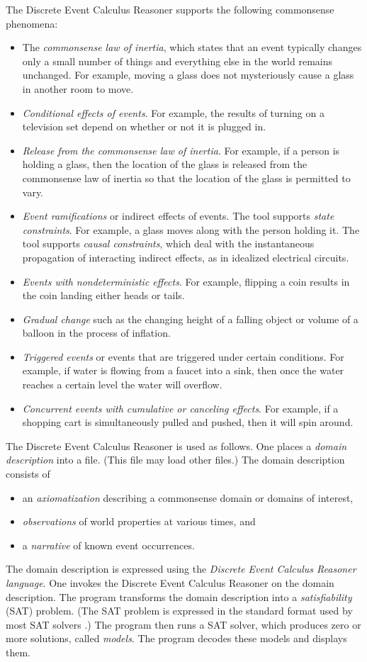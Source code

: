 \documentclass{article}
\begin{document}
The Discrete Event Calculus Reasoner supports the following commonsense
phenomena:
\begin{itemize}
\item
The {\em commonsense law of inertia}, which states that an event
typically changes only a small number of things and everything else in
the world remains unchanged. For example, moving a glass does not
mysteriously cause a glass in another room to move.
\item
{\em Conditional effects of events}. For example, the results of
turning on a television set depend on whether or not it is plugged in.
\item
{\em Release from the commonsense law of inertia}. For example, if a
person is holding a glass, then the location of the glass is released from
the commonsense law of inertia so that the location of the glass is
permitted to vary.
\item
{\em Event ramifications} or indirect effects of events. The tool
supports {\em state constraints}. For example, a glass moves along
with the person holding it. The tool supports {\em causal
constraints}, which deal with the instantaneous propagation of
interacting indirect effects, as in idealized electrical circuits.
\item
{\em Events with nondeterministic effects}. For example, flipping a
coin results in the coin landing either heads or tails.
\item
{\em Gradual change} such as the changing height of a falling object
or volume of a balloon in the process of inflation.
\item
{\em Triggered events} or events that are triggered under certain
conditions. For example, if water is flowing from a faucet into a
sink, then once the water reaches a certain level the water will
overflow.
\item
{\em Concurrent events with cumulative or canceling effects}. For
example, if a shopping cart is simultaneously pulled and pushed, then
it will spin around.
\end{itemize}

The Discrete Event Calculus Reasoner is used as follows.
One places a {\em domain description} into a file. (This file may load
other files.) The domain description consists of
\begin{itemize}
\item
an {\em axiomatization} describing a commonsense domain or domains of
interest,
\item
{\em observations} of world properties at various times, and
\item
a {\em narrative} of known event occurrences.
\end{itemize}
The domain description is expressed using the {\em Discrete Event Calculus
Reasoner language}. One invokes the Discrete Event Calculus Reasoner on the
domain description. The program transforms the domain description into a
{\em satisfiability} (SAT) problem. (The SAT problem is expressed in the
standard format used by most SAT solvers \cite{DIMACS:1993}.) The program
then runs a SAT solver, which produces zero or more solutions, called
{\em models}. The program decodes these models and displays them.
\end{document}
